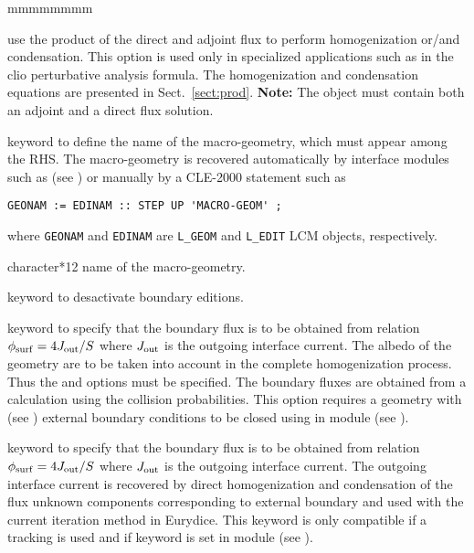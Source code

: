 \begin{ListeDeDescription}{mmmmmmmm}
\item[\moc{PROD}] use the product of the direct and adjoint flux to perform homogenization or/and
condensation. This option is used only in specialized applications such as in the {\sc clio} perturbative
analysis formula.\cite{clio} The homogenization and condensation equations are presented in Sect.~\ref{sect:prod}.
{\bf Note:} The  object must contain both an adjoint and a direct flux solution.

\item[\moc{MGEO}] keyword to define the name of the macro-geometry, which must appear among the RHS. The macro-geometry is recovered automatically
by interface modules such as  (see ) or manually by a CLE-2000 statement such as
\begin{verbatim}
GEONAM := EDINAM :: STEP UP 'MACRO-GEOM' ;
\end{verbatim}
\noindent where {\tt GEONAM} and {\tt EDINAM} are {\tt L\_GEOM} and {\tt L\_EDIT} LCM objects, respectively.

\item[\dusa{MACGEO}] character*12 name of the macro-geometry.

\item[\moc{NADF}] keyword to desactivate boundary editions.

\item[\moc{ALBS}] keyword to specify that the boundary flux is to be obtained from relation
$\phi_{\rm surf}=4J_{\rm out}/S$ where $J_{\rm out}$ is the outgoing interface current. The albedo of
the geometry are to be taken into account in the complete homogenization process. Thus the 
and  options must be specified. The boundary fluxes are obtained from a calculation using the collision
probabilities. This option requires a geometry with  (see
) external boundary conditions to be closed using  in
module  (see ).\cite{ALSB2}

\item[\moc{JOUT}] keyword to specify that the boundary flux is to be obtained from relation
$\phi_{\rm surf}=4J_{\rm out}/S$ where $J_{\rm out}$ is the outgoing interface current. The outgoing interface current
is recovered by direct homogenization and condensation of the flux unknown components corresponding to external boundary and used with the current iteration method in Eurydice. This keyword is only compatible if a  tracking is used and if
keyword  is set in module  (see ).


\end{ListeDeDescription}
